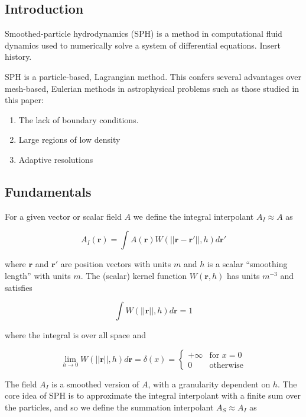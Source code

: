 \documentclass[../main.tex]{subfiles}
\begin{document}
\subsection{Introduction}
Smoothed-particle hydrodynamics (SPH) is a method in computational fluid dynamics used to
numerically solve a system of differential equations. Insert history.

SPH is a particle-based, Lagrangian method. This confers several advantages over mesh-based,
Eulerian methods in astrophysical problems such as those studied in this paper:
\begin{enumerate}
    \item The lack of boundary conditions.
    \item Large regions of low density
    \item Adaptive resolutions
\end{enumerate}

\subsection{Fundamentals}
For a given vector or scalar field $A$ we define the integral interpolant $A_I \approx A$ as

\begin{equation}
    A_I(\bm{r})
    = \int A(\bm{r}) W(||\bm{r} - \bm{r'}||, h) d\bm{r'}
\end{equation}

where $\bm{r}$ and $\bm{r'}$ are position vectors with units $m$ and $h$ is a scalar ``smoothing
length'' with units $m$. The (scalar) kernel function $W(\bm{r}, h)$ has units $m^{-3}$ and
satisfies

\begin{equation}
    \int W(||\bm{r}||, h) d\bm{r} = 1
\end{equation}

where the integral is over all space and

\begin{equation}
    \lim_{h\to0} W(||\bm{r}||, h) d\bm{r}
    = \delta(x)
    = \begin{cases}
        +\infty & \text{for } x = 0 \\
        0 & \text{otherwise} \end{cases}
\end{equation}

The field $A_I$ is a smoothed version of $A$, with a granularity dependent on $h$. The core idea of
SPH is to approximate the integral interpolant with a finite sum over the particles, and so we
define the summation interpolant $A_S \approx A_I$ as
\end{document}
